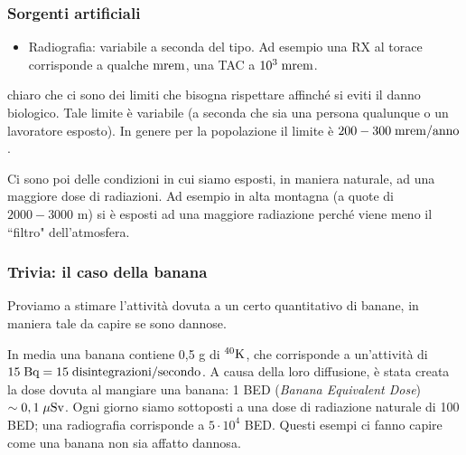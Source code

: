 \subsubsection{Sorgenti artificiali}

\begin{itemize}[leftmargin=0.5cm]
    \item Radiografia: variabile a seconda del tipo. Ad esempio una RX al torace corrisponde a qualche $\rm mrem$, una TAC a $10^3 \; \rm mrem$.
\end{itemize}

\E chiaro che ci sono dei limiti che bisogna rispettare affinché si eviti il danno biologico. Tale limite è variabile (a seconda che sia una persona qualunque o un lavoratore esposto). In genere per la popolazione il limite è $200 - 300 \; \rm mrem/anno$.

Ci sono poi delle condizioni in cui siamo esposti, in maniera naturale, ad una maggiore dose di radiazioni. Ad esempio in alta montagna (a quote di $2000-3000$ m) si è esposti ad una maggiore radiazione perché viene meno il ``filtro" dell'atmosfera.

\subsubsection{Trivia: il caso della banana}

Proviamo a stimare l'attività dovuta a un certo quantitativo di banane, in maniera tale da capire se sono dannose.

In media una banana contiene 0,5 g di $\rm ^{40}K$, che corrisponde a un'attività di $\rm 15 \; Bq=15 \; disintegrazioni/secondo$. A causa della loro diffusione, è stata creata la dose dovuta al mangiare una banana: 1 BED (\textit{Banana Equivalent Dose}) $\sim 0,1 \; \rm \mu Sv$. Ogni giorno siamo sottoposti a una dose di radiazione naturale di 100 BED; una radiografia corrisponde a $5 \cdot 10^4$ BED. Questi esempi ci fanno capire come una banana non sia affatto dannosa.